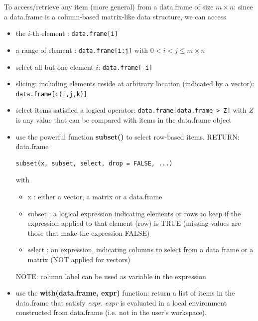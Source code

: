 To access/retrieve any item (more general) from a data.frame of size
$m\times n$: since a data.frame is a column-based matrix-like data
structure, we can access

\begin{itemize}
\item the $i$-th element : \verb!data.frame[i]!

\item a range of element : \verb!data.frame[i:j]! with $0<i<j\le
  m\times n$ 

\item select all but one element $i$: \verb!data.frame[-i]!

\item slicing: including elements reside at arbitrary location
  (indicated by a vector): \verb!data.frame[c(i,j,k)]!

\item select items satisfied a logical operator:
  \verb!data.frame[data.frame > Z]! with $Z$ is any value that can be
  compared with items in the data.frame object

\item use the powerful function {\bf subset()} to select row-based
  items. RETURN: data.frame
\begin{lstlisting}
subset(x, subset, select, drop = FALSE, ...)
\end{lstlisting}
with
\begin{itemize}
\item x : either a vector, a matrix or a data.frame
\item subset : a logical expression indicating elements or rows to
    keep if the expression applied to that element (row) is TRUE
    (missing values are those that make the expression FALSE)
   
  \item select : an expression, indicating columns to select from a
    data frame or a matrix (NOT applied for vectors)
\end{itemize}
NOTE: column label can be used as variable in the expression 

\item use the {\bf with(data.frame, expr)} function: return a list of
  items in the data.frame that satisfy {\it expr}. {\it expr} is
  evaluated in a local environment constructed from data.frame
  (i.e. not in the user's workspace).
\end{itemize}

